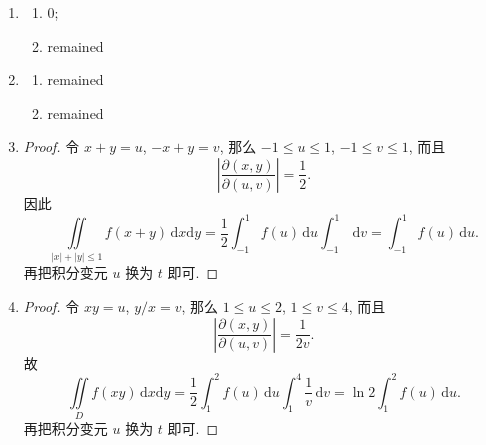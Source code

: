% 
\begin{enumerate}
    \item %
        \begin{multicols}{2}
            \begin{enumerate}[(1)]
                \item %
                    $0$;
                \item %
                    {\color{red}remained}
            \end{enumerate}
        \end{multicols}
    \item %
        \begin{multicols}{2}
            \begin{enumerate}[(1)]
                \item %
                    {\color{red}remained}
                \item %
                    {\color{red}remained}
            \end{enumerate}
        \end{multicols}
    \item %
        \begin{proof}
            令 $x+y=u$, $-x+y=v$, 那么 $-1 \leq u \leq 1$, $-1 \leq v \leq 1$, 而且
            \[
                \left|\frac{\partial(x,y)}{\partial(u,v)}\right| = \frac12.    
            \]
            因此
            \[
                \iint\limits_{|x|+|y|\leq1}f(x+y)\,\mathrm{d}x\mathrm{d}y = \frac12\int_{-1}^{1}f(u)\,\mathrm{d}u\int_{-1}^1\,\mathrm{d}v = \int_{-1}^{1}f(u)\,\mathrm{d}u.   
            \]
            再把积分变元 $u$ 换为 $t$ 即可.
        \end{proof}
    \item %
        \begin{proof}
            令 $xy=u$, $y/x=v$, 那么 $1\leq u\leq 2$, $1 \leq v \leq 4$, 而且
            \[
                \left|\frac{\partial(x,y)}{\partial(u,v)}\right| = \frac{1}{2v}.    
            \]
            故
            \[
                \iint\limits_{D}f(xy)\,\mathrm{d}x\mathrm{d}y = \frac12\int_1^2f(u)\,\mathrm{d}u\int_1^4\frac1v\,\mathrm{d}v = \ln2\int_1^2f(u)\,\mathrm{d}u.    
            \]
            再把积分变元 $u$ 换为 $t$ 即可.

\end{proof}
\end{enumerate}
